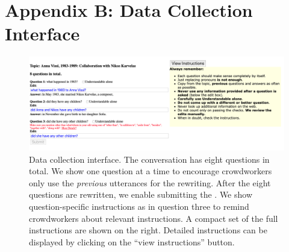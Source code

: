 \section*{Appendix B: Data Collection Interface}
\begin{figure}[h!]
	\includegraphics[width=\linewidth]{2019_emnlp_sequentialqa/figures/interface.png}

	\caption{Data collection interface. The conversation has eight questions in total. We show one question at a time
	to encourage crowdworkers only use the \textit{previous} utterances for the rewriting. After the eight questions are
	rewritten, we enable submitting the . We show question-specific instructions as in question three to remind
	crowdworkers about relevant instructions. A compact set of the full instructions are shown on the right. Detailed
	instructions can be displayed by clicking on the ``view instructions'' button.}
	\label{fig:example_convo}
\end{figure}
